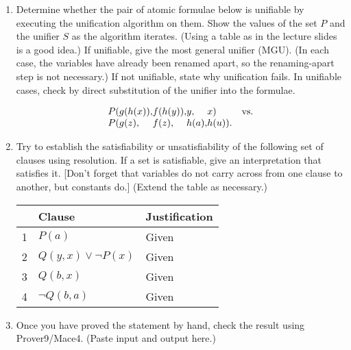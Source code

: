 \documentclass{cs81-homework}
\begin{document}
\begin{enumerate}
  \begin{solution}
  \end{solution}
  
\item {} Determine whether the pair of atomic formulae below is
  unifiable by executing the unification algorithm on them.  Show the values of
  the set \(P\) and the unifier \(S\) as the algorithm iterates.  (Using a table
  as in the lecture slides is a good idea.)  If unifiable, give the most general
  unifier (MGU).  (In each case, the variables have already been renamed apart,
  so the renaming-apart step is not necessary.)  If not unifiable, state why
  unification fails.  In unifiable cases, check by direct substitution of the
  unifier into the formulae.

  \[
    \begin{array}{l@{}l@{}l@{}l@{}ll}
      P( & g(h(x)), & f(h(y)), & y, & x) & \text{vs.} \\
      P( & g(z), & f(z), & h(a), & h(u)).
    \end{array}
  \]

  \begin{solution}
  \end{solution}
  
\item {} Try to establish the satisfiability or unsatisfiability of the
  following set of clauses using resolution.  If a set is satisfiable, give an
  interpretation that satisfies it.  [Don't forget that variables do not carry
  across from one clause to another, but constants do.]  (Extend the table as
  necessary.)

  \begin{solution}
    \begin{center}
      \begin{tabular}{|l||l|l|}
        \hline
        & Clause & Justification \\
        \hline\hline
        1 & \(P(a)\) & Given \\ \hline
        2 & \(Q(y, x) \lor \lnot P(x)\) & Given \\ \hline
        3 & \(Q(b, x)\) & Given \\ \hline
        4 & \(\lnot Q(b, a)\) & Given \\
        \hline
      \end{tabular}
    \end{center}
  \end{solution}
  
\item[]  Once you have proved the statement by hand, check the result
  using Prover9/Mace4.  (Paste input and output here.)


\end{enumerate}
\end{document}
